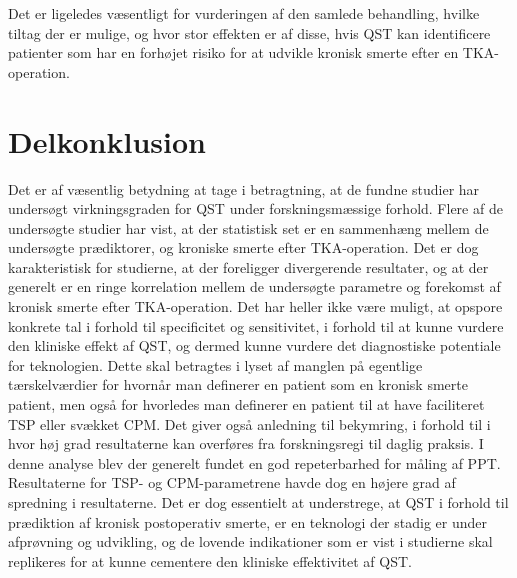 Det er ligeledes væsentligt for vurderingen af den samlede behandling, hvilke tiltag der er mulige, og hvor stor effekten er af disse, hvis QST kan identificere patienter som har en forhøjet risiko for at udvikle kronisk smerte efter en TKA-operation.

\section{Delkonklusion}
Det er af væsentlig betydning at tage i betragtning, at de fundne studier har undersøgt virkningsgraden for QST under forskningsmæssige forhold. Flere af de undersøgte studier har vist, at der statistisk set er en sammenhæng mellem de undersøgte prædiktorer, og kroniske smerte efter TKA-operation. Det er dog karakteristisk for studierne, at der foreligger divergerende resultater, og at der generelt er en ringe korrelation mellem de undersøgte parametre og forekomst af kronisk smerte efter TKA-operation. Det har heller ikke være muligt, at opspore konkrete tal i forhold til specificitet og sensitivitet, i forhold til at kunne vurdere den kliniske effekt af QST, og dermed kunne vurdere det diagnostiske potentiale for teknologien. Dette skal betragtes i lyset af manglen på egentlige tærskelværdier for hvornår man definerer en patient som en kronisk smerte patient, men også for hvorledes man definerer en patient til at have faciliteret TSP eller svækket CPM. Det giver også anledning til bekymring, i forhold til i hvor høj grad resultaterne kan overføres fra forskningsregi til daglig praksis.
I denne analyse blev der generelt fundet en god repeterbarhed for måling af PPT. Resultaterne for TSP- og CPM-parametrene havde dog en højere grad af spredning i resultaterne.
Det er dog essentielt at understrege, at QST i forhold til prædiktion af kronisk postoperativ smerte, er en teknologi der stadig er under afprøvning og udvikling, og de lovende indikationer som er vist i studierne skal replikeres for at kunne cementere den kliniske effektivitet af QST.


